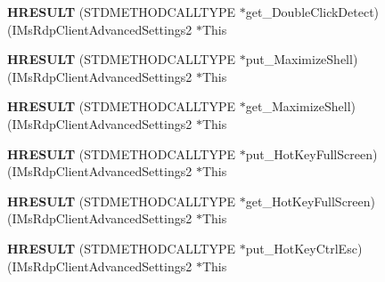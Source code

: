 \begin{DoxyCompactItemize}
\item 
\mbox{\label{struct_i_ms_rdp_client_advanced_settings2_vtbl_a186757898c356ea733ab61ff4303d302}} 
{\bfseries H\+R\+E\+S\+U\+LT} (S\+T\+D\+M\+E\+T\+H\+O\+D\+C\+A\+L\+L\+T\+Y\+PE $\ast$get\+\_\+\+Double\+Click\+Detect)(I\+Ms\+Rdp\+Client\+Advanced\+Settings2 $\ast$This
\item 
\mbox{\label{struct_i_ms_rdp_client_advanced_settings2_vtbl_a7cacc7a8c202fd364d9c59a7bf4b39e7}} 
{\bfseries H\+R\+E\+S\+U\+LT} (S\+T\+D\+M\+E\+T\+H\+O\+D\+C\+A\+L\+L\+T\+Y\+PE $\ast$put\+\_\+\+Maximize\+Shell)(I\+Ms\+Rdp\+Client\+Advanced\+Settings2 $\ast$This
\item 
\mbox{\label{struct_i_ms_rdp_client_advanced_settings2_vtbl_a4af3a6ce87a6fb9090be5565168117ba}} 
{\bfseries H\+R\+E\+S\+U\+LT} (S\+T\+D\+M\+E\+T\+H\+O\+D\+C\+A\+L\+L\+T\+Y\+PE $\ast$get\+\_\+\+Maximize\+Shell)(I\+Ms\+Rdp\+Client\+Advanced\+Settings2 $\ast$This
\item 
\mbox{\label{struct_i_ms_rdp_client_advanced_settings2_vtbl_a1b0608bac89f786c535386101d03d505}} 
{\bfseries H\+R\+E\+S\+U\+LT} (S\+T\+D\+M\+E\+T\+H\+O\+D\+C\+A\+L\+L\+T\+Y\+PE $\ast$put\+\_\+\+Hot\+Key\+Full\+Screen)(I\+Ms\+Rdp\+Client\+Advanced\+Settings2 $\ast$This
\item 
\mbox{\label{struct_i_ms_rdp_client_advanced_settings2_vtbl_a4c14d373006d3fee584f1eac0d612cc3}} 
{\bfseries H\+R\+E\+S\+U\+LT} (S\+T\+D\+M\+E\+T\+H\+O\+D\+C\+A\+L\+L\+T\+Y\+PE $\ast$get\+\_\+\+Hot\+Key\+Full\+Screen)(I\+Ms\+Rdp\+Client\+Advanced\+Settings2 $\ast$This
\item 
\mbox{\label{struct_i_ms_rdp_client_advanced_settings2_vtbl_a2055a0297634784782c5991fc74c37b2}} 
{\bfseries H\+R\+E\+S\+U\+LT} (S\+T\+D\+M\+E\+T\+H\+O\+D\+C\+A\+L\+L\+T\+Y\+PE $\ast$put\+\_\+\+Hot\+Key\+Ctrl\+Esc)(I\+Ms\+Rdp\+Client\+Advanced\+Settings2 $\ast$This
\item 
\mbox{\label{struct_i_ms_rdp_client_advanced_settings2_vtbl_afbcecc230e5951102e54319cbc07590c}} 

\end{DoxyCompactItemize}
